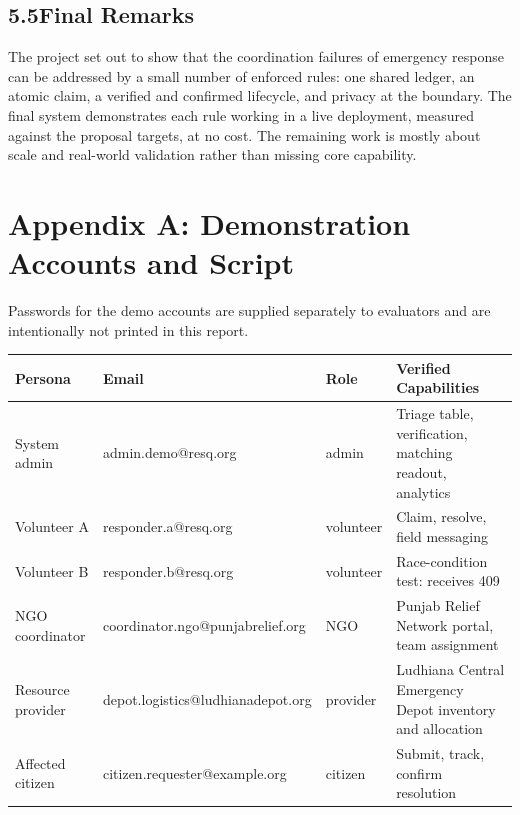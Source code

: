 \documentclass[11pt,a4paper]{article}
\begin{document}
\subsection{5.5\quad Final Remarks}\label{s55}

The project set out to show that the coordination failures of emergency response can be addressed by a small number of enforced rules: one shared ledger, an atomic claim, a verified and confirmed lifecycle, and privacy at the boundary. The final system demonstrates each rule working in a live deployment, measured against the proposal targets, at no cost. The remaining work is mostly about scale and real-world validation rather than missing core capability.

\newpage

\label{appA}
\section*{Appendix A: Demonstration Accounts and Script}

Passwords for the demo accounts are supplied separately to evaluators and are intentionally not printed in this report.

\renewcommand{\arraystretch}{1.2}
\begin{tabularx}{\textwidth}{@{}p{1.15in}p{2.35in}p{0.8in}X@{}}
\toprule
\textbf{Persona} & \textbf{Email} & \textbf{Role} & \textbf{Verified Capabilities}\\
\midrule
System admin & admin.demo@resq.org & admin & Triage table, verification, matching readout, analytics\\
Volunteer A & responder.a@resq.org & volunteer & Claim, resolve, field messaging\\
Volunteer B & responder.b@resq.org & volunteer & Race-condition test: receives 409\\
NGO coordinator & coordinator.ngo@punjabrelief.org & NGO & Punjab Relief Network portal, team assignment\\
Resource provider & depot.logistics@ludhianadepot.org & provider & Ludhiana Central Emergency Depot inventory and allocation\\
Affected citizen & citizen.requester@example.org & citizen & Submit, track, confirm resolution\\
\bottomrule
\end{tabularx}
\renewcommand{\arraystretch}{1}
\end{document}
